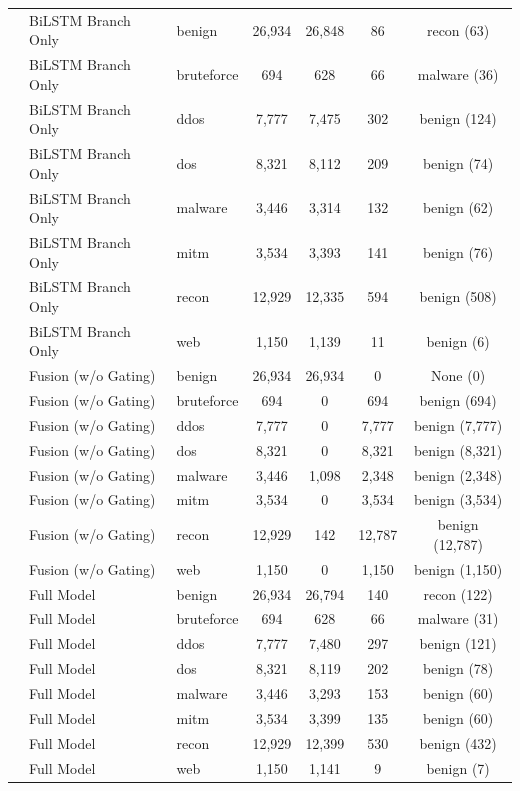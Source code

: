 \documentclass[a4paper,fleqn]{cas-sc}
\begin{document}
\begin{landscape}
\begin{longtable}{lllcccc}
 & BiLSTM Branch Only & benign & 26,934 & 26,848 & 86 & recon (63) \\
 & BiLSTM Branch Only & bruteforce & 694 & 628 & 66 & malware (36) \\
 & BiLSTM Branch Only & ddos & 7,777 & 7,475 & 302 & benign (124) \\
 & BiLSTM Branch Only & dos & 8,321 & 8,112 & 209 & benign (74) \\
 & BiLSTM Branch Only & malware & 3,446 & 3,314 & 132 & benign (62) \\
 & BiLSTM Branch Only & mitm & 3,534 & 3,393 & 141 & benign (76) \\
 & BiLSTM Branch Only & recon & 12,929 & 12,335 & 594 & benign (508) \\
 & BiLSTM Branch Only & web & 1,150 & 1,139 & 11 & benign (6) \\
 & Fusion (w/o Gating) & benign & 26,934 & 26,934 & 0 & None (0) \\
 & Fusion (w/o Gating) & bruteforce & 694 & 0 & 694 & benign (694) \\
 & Fusion (w/o Gating) & ddos & 7,777 & 0 & 7,777 & benign (7,777) \\
 & Fusion (w/o Gating) & dos & 8,321 & 0 & 8,321 & benign (8,321) \\
 & Fusion (w/o Gating) & malware & 3,446 & 1,098 & 2,348 & benign (2,348) \\
 & Fusion (w/o Gating) & mitm & 3,534 & 0 & 3,534 & benign (3,534) \\
 & Fusion (w/o Gating) & recon & 12,929 & 142 & 12,787 & benign (12,787) \\
 & Fusion (w/o Gating) & web & 1,150 & 0 & 1,150 & benign (1,150) \\
 & Full Model & benign & 26,934 & 26,794 & 140 & recon (122) \\
 & Full Model & bruteforce & 694 & 628 & 66 & malware (31) \\
 & Full Model & ddos & 7,777 & 7,480 & 297 & benign (121) \\
 & Full Model & dos & 8,321 & 8,119 & 202 & benign (78) \\
 & Full Model & malware & 3,446 & 3,293 & 153 & benign (60) \\
 & Full Model & mitm & 3,534 & 3,399 & 135 & benign (60) \\
 & Full Model & recon & 12,929 & 12,399 & 530 & benign (432) \\
 & Full Model & web & 1,150 & 1,141 & 9 & benign (7) \\
\bottomrule
\end{longtable}
\end{landscape}
\end{document}
